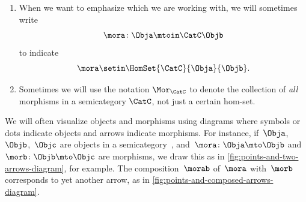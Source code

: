 \begin{remark}
    \begin{enumerate}
        \item When we want to emphasize which  we are working with, we will sometimes write
              \begin{equation}
                  \mora \colon \Obja \mtoin\CatC \Objb
              \end{equation}
              to indicate
              \begin{equation}
                  \mora \setin \HomSet{\CatC}{\Obja}{\Objb}.
              \end{equation}
        \item Sometimes we will use the notation $\Mor_\CatC$ to denote the collection of \emph{all} morphisms in a semicategory $\CatC$, not just a certain hom-set.
    \end{enumerate}
\end{remark}


\begin{marginfigure}
    \centering
    \caption{}
    \label{fig:points-and-two-arrows-diagram}
\end{marginfigure}

\begin{marginfigure}
    \centering
    \caption{}
    \label{fig:points-and-composed-arrows-diagram}
\end{marginfigure}

\begin{remark}
    We will often visualize objects and morphisms using diagrams where symbols or dots indicate objects and arrows indicate morphisms.
    For instance, if~$\Obja$,~$\Objb$,~$\Objc$ are objects in a semicategory~\CatC, and~$\mora\colon \Obja \mto \Objb$ and~$\morb\colon \Objb \mto \Objc$ are morphisms, we draw this as in \cref{fig:points-and-two-arrows-diagram}, for example.
    The composition~$\morab$ of~$\mora$ with~$\morb$ corresponds to yet another arrow, as in \cref{fig:points-and-composed-arrows-diagram}.
\end{remark}


